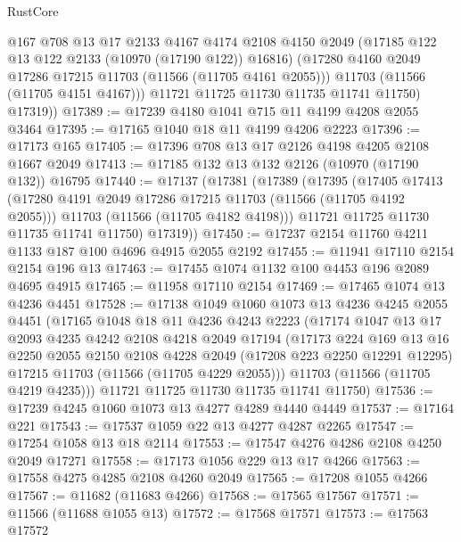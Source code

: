\begin{lexlean}{RustCore}
\begin{coremodule}
            @167
            @708
            @13
            @17
            @2133
            @4167
            @4174
            @2108
            @4150
            @2049
            (@17185 @122 @13 @122 @2133 (@10970 (@17190 @122)) @16816)
            (@17280 @4160 @2049 @17286 @17215 @11703 (@11566 (@11705 @4161 @2055)))
            @11703
            (@11566 (@11705 @4151 @4167)))
          @11721
          @11725
          @11730
          @11735
          @11741
          @11750)
        @17319))
@17389 := @17239 @4180 @1041 @715 @11 @4199 @4208 @2055 @3464
@17395 := @17165 @1040 @18 @11 @4199 @4206 @2223
@17396 := @17173 @165
@17405 := @17396 @708 @13 @17 @2126 @4198 @4205 @2108 @1667 @2049
@17413 := @17185 @132 @13 @132 @2126 (@10970 (@17190 @132)) @16795
@17440 := @17137
    (@17381
      (@17389
        (@17395
          (@17405
            @17413
            (@17280 @4191 @2049 @17286 @17215 @11703 (@11566 (@11705 @4192 @2055)))
            @11703
            (@11566 (@11705 @4182 @4198)))
          @11721
          @11725
          @11730
          @11735
          @11741
          @11750)
        @17319))
@17450 := @17237 @2154 @11760 @4211 @1133 @187 @100 @4696 @4915 @2055 @2192
@17455 := @11941 @17110 @2154 @2154 @196 @13
@17463 := @17455 @1074 @1132 @100 @4453 @196 @2089 @4695 @4915
@17465 := @11958 @17110 @2154
@17469 := @17465 @1074 @13 @4236 @4451
@17528 := @17138
    @1049
    @1060
    @1073
    @13
    @4236
    @4245
    @2055
    @4451
    (@17165
      @1048
      @18
      @11
      @4236
      @4243
      @2223
      (@17174
        @1047
        @13
        @17
        @2093
        @4235
        @4242
        @2108
        @4218
        @2049
        @17194
        (@17173
          @224
          @169
          @13
          @16
          @2250
          @2055
          @2150
          @2108
          @4228
          @2049
          (@17208 @223 @2250 @12291 @12295)
          @17215
          @11703
          (@11566 (@11705 @4229 @2055)))
        @11703
        (@11566 (@11705 @4219 @4235)))
      @11721
      @11725
      @11730
      @11735
      @11741
      @11750)
@17536 := @17239 @4245 @1060 @1073 @13 @4277 @4289 @4440 @4449
@17537 := @17164 @221
@17543 := @17537 @1059 @22 @13 @4277 @4287 @2265
@17547 := @17254 @1058 @13 @18 @2114
@17553 := @17547 @4276 @4286 @2108 @4250 @2049 @17271
@17558 := @17173 @1056 @229 @13 @17 @4266
@17563 := @17558 @4275 @4285 @2108 @4260 @2049
@17565 := @17208 @1055 @4266
@17567 := @11682 (@11683 @4266)
@17568 := @17565 @17567
@17571 := @11566 (@11688 @1055 @13)
@17572 := @17568 @17571
@17573 := @17563 @17572

\end{coremodule}
\end{lexlean}
